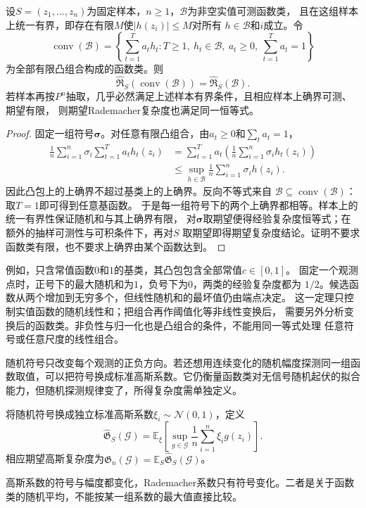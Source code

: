 \begin{theorem}[凸组合的Rademacher复杂度]
\label{thm:ensemble-convex-hull}
设$S=(z_1,\ldots,z_n)$为固定样本，$n\geq1$，$\mathcal B$为非空实值可测函数类，
且在这组样本上统一有界，即存在有限$M$使$|h(z_i)|\leq M$对所有
$h\in\mathcal B$和$i$成立。令
\[
 \operatorname{conv}(\mathcal B)
 =\left\{\sum_{t=1}^T a_t h_t:
 T\geq1,\ h_t\in\mathcal B,\ a_t\geq0,\ \sum_{t=1}^T a_t=1\right\}
\]
为全部有限凸组合构成的函数类。则
\[
 \widehat{\mathfrak R}_S(\operatorname{conv}(\mathcal B))
 =\widehat{\mathfrak R}_S(\mathcal B).
\]
若样本再按$P^n$抽取，几乎必然满足上述样本有界条件，且相应样本上确界可测、期望有限，
则期望Rademacher复杂度也满足同一恒等式。
\end{theorem}

\begin{proof}
固定一组符号$\bm\sigma$。对任意有限凸组合，由$a_t\geq0$和$\sum_ta_t=1$，
\[
 \begin{aligned}
 \frac1n\sum_{i=1}^n\sigma_i\sum_{t=1}^T a_t h_t(z_i)
 &=\sum_{t=1}^T a_t
    \left(\frac1n\sum_{i=1}^n\sigma_i h_t(z_i)\right)\\
 &\leq\sup_{h\in\mathcal B}\frac1n\sum_{i=1}^n\sigma_i h(z_i).
 \end{aligned}
\]
因此凸包上的上确界不超过基类上的上确界。反向不等式来自
$\mathcal B\subseteq\operatorname{conv}(\mathcal B)$：取$T=1$即可得到任意基函数。
于是每一组符号下的两个上确界都相等。样本上的统一有界性保证随机和与其上确界有限，
对$\bm\sigma$取期望便得经验复杂度恒等式；在额外的抽样可测性与可积条件下，再对$S$
取期望即得期望复杂度结论。证明不要求函数类有限，也不要求上确界由某个函数达到。
\end{proof}

例如，只含常值函数$0$和$1$的基类，其凸包包含全部常值$c\in[0,1]$。
固定一个观测点时，正号下的最大随机和为$1$，负号下为$0$，两类的经验复杂度都为
$1/2$。候选函数从两个增加到无穷多个，但线性随机和的最坏值仍由端点决定。
这一定理只控制实值函数的随机线性和；把组合再作阈值化等非线性变换后，
需要另外分析变换后的函数类。非负性与归一化也是凸组合的条件，不能用同一等式处理
任意符号或任意尺度的线性组合。

随机符号只改变每个观测的正负方向。若还想用连续变化的随机幅度探测同一组函数取值，可以把符号换成标准高斯系数。它仍衡量函数类对无信号随机起伏的拟合能力，但随机探测规律变了，所得复杂度需单独定义。
\begin{definition}[经验高斯复杂度]
  \label{def:gaussian-complexity}
  将随机符号换成独立标准高斯系数\(\xi_i\sim\mathcal N(0,1)\)，定义
  \[
    \widehat{\mathfrak G}_S(\mathcal G)
    =\mathbb E_\xi\left[\sup_{g\in\mathcal G}\frac1n\sum_{i=1}^n\xi_i g(z_i)\right].
  \]
  相应期望高斯复杂度为\(\mathfrak G_n(\mathcal G)=\mathbb E_S\widehat{\mathfrak G}_S(\mathcal G)\)。
\end{definition}
高斯系数的符号与幅度都变化，Rademacher系数只有符号变化。二者是关于函数类的随机平均，不能按某一组系数的最大值直接比较。

